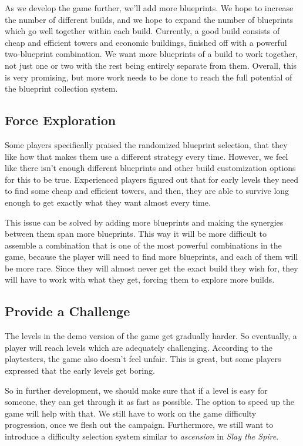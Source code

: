 As we develop the game further, we'll add more blueprints.
We hope to increase the number of different builds, and we hope to expand the number of blueprints which go well together within each build.
Currently, a good build consists of cheap and efficient towers and economic buildings, finished off with a powerful two-blueprint combination.
We want more blueprints of a build to work together, not just one or two with the rest being entirely separate from them.
Overall, this is very promising, but more work needs to be done to reach the full potential of the blueprint collection system.

\subsection{Force Exploration}

Some players specifically praised the randomized blueprint selection, that they like how that makes them use a different strategy every time.
However, we feel like there isn't enough different blueprints and other build customization options for this to be true.
Experienced players figured out that for early levels they need to find some cheap and efficient towers, and then, they are able to survive long enough to get exactly what they want almost every time.

This issue can be solved by adding more blueprints and making the synergies between them span more blueprints.
This way it will be more difficult to assemble a combination that is one of the most powerful combinations in the game, because the player will need to find more blueprints, and each of them will be more rare.
Since they will almost never get the exact build they wish for, they will have to work with what they get, forcing them to explore more builds.

\subsection{Provide a Challenge}

The levels in the demo version of the game get gradually harder.
So eventually, a player will reach levels which are adequately challenging.
According to the playtesters, the game also doesn't feel unfair.
This is great, but some players expressed that the early levels get boring.

So in further development, we should make sure that if a level is easy for someone, they can get through it as fast as possible.
The option to speed up the game will help with that.
We still have to work on the game difficulty progression, once we flesh out the campaign.
Furthermore, we still want to introduce a difficulty selection system similar to \emph{ascension} in \emph{Slay the Spire}.